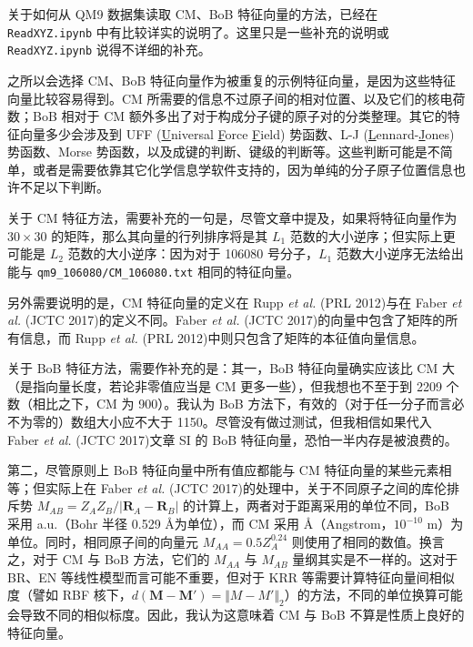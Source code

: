 \documentclass[10pt,a4paper,onecolumn]{article}
\numberwithin{equation}{section}
\begin{document}
关于如何从 QM9 数据集读取 CM、BoB 特征向量的方法，已经在 \verb|ReadXYZ.ipynb| 中有比较详实的说明了。这里只是一些补充的说明或 \verb|ReadXYZ.ipynb| 说得不详细的补充。

之所以会选择 CM、BoB 特征向量作为被重复的示例特征向量，是因为这些特征向量比较容易得到。CM 所需要的信息不过原子间的相对位置、以及它们的核电荷数；BoB 相对于 CM 额外多出了对于构成分子键的原子对的分类整理。其它的特征向量多少会涉及到 UFF (\underline Universal \underline Force \underline Field) 势函数、L-J (\underline Lennard-\underline Jones) 势函数、Morse 势函数，以及成键的判断、键级的判断等。这些判断可能是不简单，或者是需要依靠其它化学信息学软件支持的，因为单纯的分子原子位置信息也许不足以下判断。

关于 CM 特征方法，需要补充的一句是，尽管文章中提及，如果将特征向量作为 $ 30 \times 30 $ 的矩阵，那么其向量的行列排序将是其 $ L_1 $ 范数的大小逆序；但实际上更可能是 $ L_2 $ 范数的大小逆序：因为对于 106080 号分子，$ L_1 $ 范数大小逆序无法给出能与 \verb|qm9_106080/CM_106080.txt| 相同的特征向量。

另外需要说明的是，CM 特征向量的定义在 Rupp \emph{et al.} (PRL 2012)\citep{Rupp-Lilienfeld.PRL.2012.108}与在 Faber \emph{et al.} (JCTC 2017)\citep{Faber-Lilienfeld.JCTC.2017.13}的定义不同。Faber \emph{et al.} (JCTC 2017)\citep{Faber-Lilienfeld.JCTC.2017.13}的向量中包含了矩阵的所有信息，而 Rupp \emph{et al.} (PRL 2012)\citep{Rupp-Lilienfeld.PRL.2012.108}中则只包含了矩阵的本征值向量信息。

关于 BoB 特征方法，需要作补充的是：其一，BoB 特征向量确实应该比 CM 大（是指向量长度，若论非零值应当是 CM 更多一些），但我想也不至于到 2209 个数（相比之下，CM 为 900）。我认为 BoB 方法下，有效的（对于任一分子而言必不为零的）数组大小应不大于 1150。尽管没有做过测试，但我相信如果代入 Faber \emph{et al.} (JCTC 2017)\citep{Faber-Lilienfeld.JCTC.2017.13}文章 SI 的 BoB 特征向量，恐怕一半内存是被浪费的。

第二，尽管原则上 BoB 特征向量中所有值应都能与 CM 特征向量的某些元素相等；但实际上在 Faber \emph{et al.} (JCTC 2017)\citep{Faber-Lilienfeld.JCTC.2017.13}的处理中，关于不同原子之间的库伦排斥势 $ M_{AB} = Z_A Z_B / |\bm R_A - \bm R_B| $ 的计算上，两者对于距离采用的单位不同，BoB 采用 a.u.（Bohr 半径 0.529 \AA 为单位），而 CM 采用 \AA（Angstrom，$ 10^{-10} $ m）为单位。同时，相同原子间的向量元 $ M_{AA} = 0.5 Z_A^{0.24} $ 则使用了相同的数值。换言之，对于 CM 与 BoB 方法，它们的 $ M_{AA} $ 与 $ M_{AB} $ 量纲其实是不一样的。这对于 BR、EN 等线性模型而言可能不重要，但对于 KRR 等需要计算特征向量间相似度（譬如 RBF 核下，$ d(\bm M - \bm M') = \Vert M - M' \Vert_2 $）的方法，不同的单位换算可能会导致不同的相似标度。因此，我认为这意味着 CM 与 BoB 不算是性质上良好的特征向量。
\end{document}
